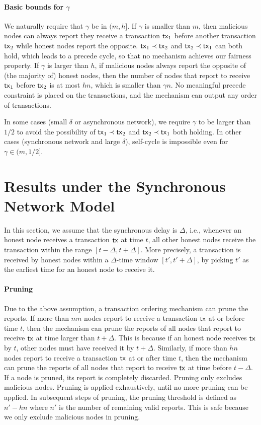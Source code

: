\documentclass[runningheads]{llncs}
\begin{document}
\paragraph{Basic bounds for $\gamma$} We naturally require that $\gamma$ be in $(m, h]$. If $\gamma$ is smaller than $m$, then malicious nodes can always report they receive a transaction $\mathsf{tx}_1$ before another transaction $\mathsf{tx}_2$ while honest nodes report the opposite. $\mathsf{tx}_1\prec\mathsf{tx}_2$ and $\mathsf{tx}_2\prec\mathsf{tx}_1$ can both hold, which leads to a precede cycle, so that no mechanism achieves our fairness property. If $\gamma$ is larger than $h$, if malicious nodes always report the opposite of (the majority of) honest nodes, then the number of nodes that report to receive $\mathsf{tx}_1$ before $\mathsf{tx}_2$ is at most $h n$, which is smaller than $\gamma n$. No meaningful precede constraint is placed on the transactions, and the mechanism can output any order of transactions. 

In some cases (small $\delta$ or asynchronous network), we require $\gamma$ to be larger than $1/2$ to avoid the possibility of $\mathsf{tx}_1\prec \mathsf{tx}_2$ and $\mathsf{tx}_2\prec \mathsf{tx}_1$ both holding. In other cases (synchronous network and large $\delta$), self-cycle is impossible even for $\gamma\in (m, 1/2]$. 

\section{Results under the Synchronous Network Model}

In this section, we assume that the synchronous delay is $\Delta$, i.e., whenever an honest node receives a transaction $\mathsf{tx}$ at time $t$, all other honest nodes receive the transaction within the range $[t-\Delta, t+\Delta]$. More precisely, a transaction is received by honest nodes within a $\Delta$-time window $[t', t'+\Delta]$, by picking $t'$ as the earliest time for an honest node to receive it. 

\paragraph{Pruning} Due to the above assumption, a transaction ordering mechanism can prune the reports. If more than $mn$ nodes report to receive a transaction $\mathsf{tx}$ at or before time $t$, then the mechanism can prune the reports of all nodes that report to receive $\mathsf{tx}$ at time larger than $t+\Delta$. This is because if an honest node receives $\mathsf{tx}$ by $t$, other nodes must have received it by $t+\Delta$. Similarly, if more than $hn$ nodes report to receive a transaction $\mathsf{tx}$ at or after time $t$, then the mechanism can prune the reports of all nodes that report to receive $\mathsf{tx}$ at time before $t-\Delta$. If a node is pruned, its report is completely discarded. Pruning only excludes malicious nodes. Pruning is applied exhaustively, until no more pruning can be applied. In subsequent steps of pruning, the pruning threshold is defined as $n'-hn$ where $n'$ is the number of remaining valid reports. This is safe because we only exclude malicious nodes in pruning. 
\end{document}
